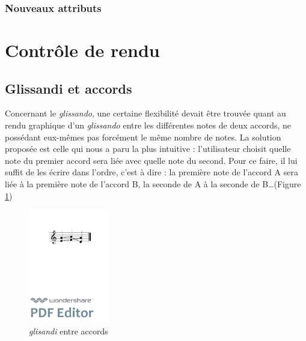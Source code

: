 \documentclass{article}
\newenvironment{gmncode}	{\vspace{-2mm}\small\verbatim}{\endverbatim\vspace{-2mm}}
\begin{document}
\subsubsection{Nouveaux attributs}\label{subsubsec:attributs}



\section{Contr\^ole de rendu}\label{sec:controleRendu}

\subsection{Glissandi et accords}\label{subsec:glissandiAccords}

Concernant le \emph{glissando}, une certaine flexibilité devait être trouvée quant au rendu graphique d'un \emph{glissando} entre les différentes notes de deux accords, ne possédant eux-mêmes pas forcément le même nombre de notes. La solution proposée est celle qui nous a paru la plus intuitive : l'utilisateur choisit quelle note du premier accord sera liée avec quelle note du second. Pour ce faire, il lui suffit de les écrire dans l'ordre, c'est à dire : la première note de l'accord A sera liée à la première note de l'accord B, la seconde de A à la seconde de B\dots{}(Figure \ref{fig:glissandosimple})

\begin{figure}[h]
\begin{center}
\begin{gmncode}
[\glissando({e,a} {f,b} {a,d})]
\end{gmncode}
\bigskip

\includegraphics[width=35mm]{img/glissandosimple.pdf}
\caption{\emph{glisandi} entre accords}
\label{fig:glissandosimple}
\end{center}
\end{figure}
\end{document}
